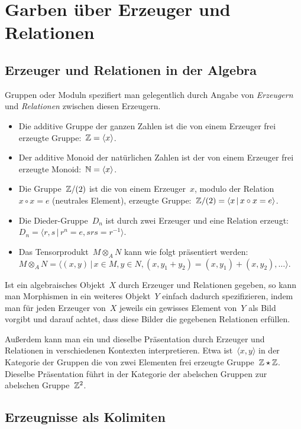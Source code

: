 \documentclass{uebblatt}
\begin{document}
\section*{Garben über Erzeuger und Relationen}

\subsection*{Erzeuger und Relationen in der Algebra}

Gruppen oder Moduln spezifiert man gelegentlich durch Angabe von
\emph{Erzeugern} und \emph{Relationen} zwischen diesen Erzeugern.

\begin{itemize}
\item Die additive Gruppe der ganzen Zahlen ist die von einem Erzeuger frei
erzeugte Gruppe:~$\mathbb{Z} = \langle x \rangle$.
\item Der additive Monoid der natürlichen Zahlen ist der von einem Erzeuger
frei erzeugte Monoid:~$\mathbb{N} = \langle x \rangle$.
\item Die Gruppe~$\mathbb{Z}/(2)$ ist die von einem Erzeuger~$x$, modulo der
Relation~$x \circ x = e$ (neutrales Element), erzeugte Gruppe:~$\mathbb{Z}/(2) =
\langle x \,|\, x \circ x = e \rangle$.
\item Die Dieder-Gruppe~$D_n$ ist durch zwei Erzeuger und eine Relation
erzeugt:~$D_n = \langle r,s \,|\, r^n = e, srs = r^{-1} \rangle$.
\item Das Tensorprodukt~$M \otimes_A N$ kann wie folgt präsentiert werden:~$M
\otimes_A N = \langle (x,y) \,|\, x \in M, y \in N, (x,y_1+y_2) =
(x,y_1)+(x,y_2), \ldots \rangle$.
\end{itemize}

Ist ein algebraisches Objekt~$X$ durch Erzeuger und Relationen gegeben, so kann
man Morphismen in ein weiteres Objekt~$Y$ einfach dadurch spezifizieren, indem
man für jeden Erzeuger von~$X$ jeweils ein gewisses Element von~$Y$ als Bild
vorgibt und darauf achtet, dass diese Bilder die gegebenen Relationen erfüllen.

Außerdem kann man ein und dieselbe Präsentation durch Erzeuger und Relationen
in verschiedenen Kontexten interpretieren. Etwa ist~$\langle x,y \rangle$ in
der Kategorie der Gruppen die von zwei Elementen frei erzeugte Gruppe~$\mathbb{Z}
\star \mathbb{Z}$. Dieselbe Präsentation führt in der Kategorie der abelschen Gruppen
zur abelschen Gruppe~$\mathbb{Z}^2$.


\subsection*{Erzeugnisse als Kolimiten}
\end{document}
